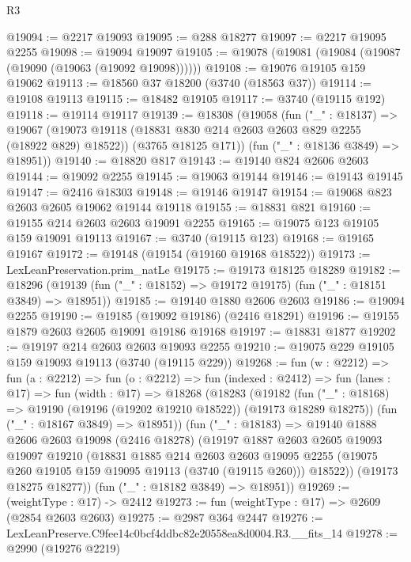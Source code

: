 \begin{lexlean}{R3}
\begin{coremodule}
@19094 := @2217 @19093
@19095 := @288 @18277
@19097 := @2217 @19095 @2255
@19098 := @19094 @19097
@19105 := @19078 (@19081 (@19084 (@19087 (@19090 (@19063 (@19092 @19098))))))
@19108 := @19076 @19105 @159 @19062
@19113 := @18560 @37 @18200 (@3740 (@18563 @37))
@19114 := @19108 @19113
@19115 := @18482 @19105
@19117 := @3740 (@19115 @192)
@19118 := @19114 @19117
@19139 := @18308
    (@19058
      (fun ("_" : @18137) =>
      @19067
        (@19073 @19118 (@18831 @830 @214 @2603 @2603 @829 @2255 (@18922 @829) @18522))
        (@3765 @18125 @171))
      (fun ("_" : @18136 @3849) => @18951))
@19140 := @18820 @817
@19143 := @19140 @824 @2606 @2603
@19144 := @19092 @2255
@19145 := @19063 @19144
@19146 := @19143 @19145
@19147 := @2416 @18303
@19148 := @19146 @19147
@19154 := @19068 @823 @2603 @2605 @19062 @19144 @19118
@19155 := @18831 @821
@19160 := @19155 @214 @2603 @2603 @19091 @2255
@19165 := @19075 @123 @19105 @159 @19091 @19113
@19167 := @3740 (@19115 @123)
@19168 := @19165 @19167
@19172 := @19148 (@19154 (@19160 @19168 @18522))
@19173 := LexLeanPreservation.prim_natLe
@19175 := @19173 @18125 @18289
@19182 := @18296 (@19139 (fun ("_" : @18152) => @19172 @19175) (fun ("_" : @18151 @3849) => @18951))
@19185 := @19140 @1880 @2606 @2603
@19186 := @19094 @2255
@19190 := @19185 (@19092 @19186) (@2416 @18291)
@19196 := @19155 @1879 @2603 @2605 @19091 @19186 @19168
@19197 := @18831 @1877
@19202 := @19197 @214 @2603 @2603 @19093 @2255
@19210 := @19075 @229 @19105 @159 @19093 @19113 (@3740 (@19115 @229))
@19268 := fun (w : @2212) =>
  fun (a : @2212) =>
  fun (o : @2212) =>
  fun (indexed : @2412) =>
  fun (lanes : @17) =>
  fun (width : @17) =>
  @18268
    (@18283
      (@19182
        (fun ("_" : @18168) => @19190 (@19196 (@19202 @19210 @18522)) (@19173 @18289 @18275))
        (fun ("_" : @18167 @3849) => @18951))
      (fun ("_" : @18183) =>
      @19140
        @1888
        @2606
        @2603
        @19098
        (@2416 @18278)
        (@19197
          @1887
          @2603
          @2605
          @19093
          @19097
          @19210
          (@18831
            @1885
            @214
            @2603
            @2603
            @19095
            @2255
            (@19075 @260 @19105 @159 @19095 @19113 (@3740 (@19115 @260)))
            @18522))
        (@19173 @18275 @18277))
      (fun ("_" : @18182 @3849) => @18951))
@19269 := (weightType : @17) -> @2412
@19273 := fun (weightType : @17) => @2609 (@2854 @2603 @2603)
@19275 := @2987 @364 @2447
@19276 := LexLeanPreserve.C9fee14c0bcf4ddbc82e20558ea8d0004.R3.__fits_14
@19278 := @2990 (@19276 @2219)

\end{coremodule}
\end{lexlean}
